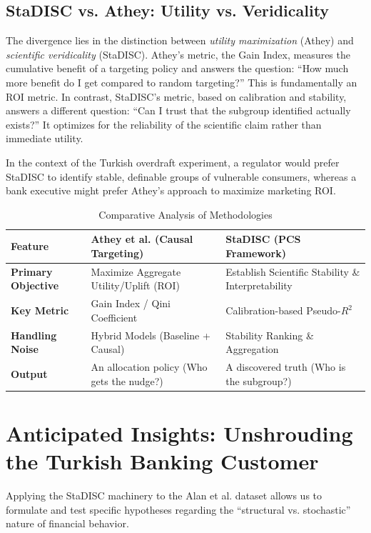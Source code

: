 \documentclass[11pt,a4paper]{article}
\begin{document}
	\subsection{StaDISC vs. Athey: Utility vs. Veridicality}
	The divergence lies in the distinction between \emph{utility maximization} (Athey) and \emph{scientific veridicality} (StaDISC). Athey's metric, the Gain Index, measures the cumulative benefit of a targeting policy and answers the question: ``How much more benefit do I get compared to random targeting?'' This is fundamentally an ROI metric. In contrast, StaDISC's metric, based on calibration and stability, answers a different question: ``Can I trust that the subgroup identified actually exists?'' It optimizes for the reliability of the scientific claim rather than immediate utility.
	
	In the context of the Turkish overdraft experiment, a regulator would prefer StaDISC to identify stable, definable groups of vulnerable consumers, whereas a bank executive might prefer Athey's approach to maximize marketing ROI.
	
	\begin{table}[H]
		\centering
		\caption{Comparative Analysis of Methodologies}
		\label{tab:comparison}
		\begin{tabular}{p{3.5cm} p{5.5cm} p{5.5cm}}
			\toprule
			\textbf{Feature} & \textbf{Athey et al. (Causal Targeting)} & \textbf{StaDISC (PCS Framework)} \\ 
			\midrule
			\textbf{Primary Objective} & Maximize Aggregate Utility/Uplift (ROI) & Establish Scientific Stability \& Interpretability \\ \addlinespace
			\textbf{Key Metric} & Gain Index / Qini Coefficient & Calibration-based Pseudo-$R^2$ \\ \addlinespace
			\textbf{Handling Noise} & Hybrid Models (Baseline + Causal) & Stability Ranking \& Aggregation \\ \addlinespace
			\textbf{Output} & An allocation policy (Who gets the nudge?) & A discovered truth (Who is the subgroup?) \\ 
			\bottomrule
		\end{tabular}
	\end{table}
	
	\section{Anticipated Insights: Unshrouding the Turkish Banking Customer}
	Applying the StaDISC machinery to the Alan et al. dataset allows us to formulate and test specific hypotheses regarding the ``structural vs. stochastic'' nature of financial behavior.
	
\end{document}
